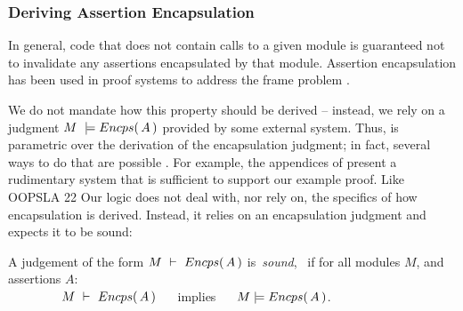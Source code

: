 %

\subsubsection{Deriving  Assertion Encapsulation}

{In general},  code that does not contain 
calls to a {given} module is guaranteed not to invalidate any assertions encapsulated by that module.
 Assertion encapsulation has been used in proof systems to {address}   the  {frame} problem
 \cite{objInvars,encaps}. 

We  do not mandate how this property should be derived -- instead, we rely on a judgment 
$M\ \models  \encaps{A}$ provided by some external system. 
Thus, \SpecLang is parametric over the derivation of the encapsulation
     judgment; in fact, several ways to do that are possible \cite{TAME2003,ownEncaps,objInvars}. For example,
 the appendices of
    \cite{necessityFull} present a 
    rudimentary system that is sufficient to support our example
    proof.   Like OOPSLA 22 Our logic does not {deal with, nor} rely on, the specifics of  how   encapsulation
{is derived}.
{Instead, it relies} on an encapsulation judgment and expects it to be sound:

\begin{definition}
\label{lem:encap-soundness}
A judgement of the form $M\ \vdash\ {Encps(\, A\, )}$  is\  \emph{sound}, \ if 
for all modules $M$, and assertions $A$:\\

$\strut \hspace{1.5cm} M\ \vdash\ {Encps(\, A\, )} \ \ \ \ $ implies $\ \ \ \ \satisfies{M}{\encaps{A}}$.
\end{definition}


